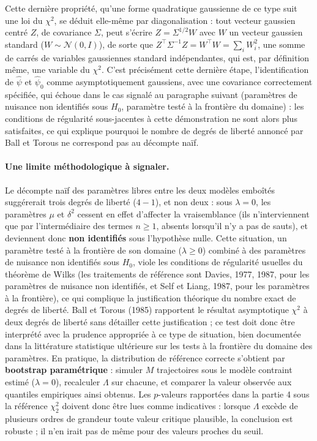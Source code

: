 \documentclass{article}
\begin{document}
Cette dernière propriété, qu'une forme quadratique gaussienne de ce type suit une loi du $\chi^2$, se déduit elle-même par diagonalisation : tout vecteur gaussien centré $Z$, de covariance $\Sigma$, peut s'écrire $Z=\Sigma^{1/2}W$ avec $W$ un vecteur gaussien standard ($W\sim\mathcal{N}(0,I)$), de sorte que $Z^\top \Sigma^{-1} Z = W^\top W = \sum_i W_i^2$, une somme de carrés de variables gaussiennes standard indépendantes, qui est, par définition même, une variable du $\chi^2$.
C'est précisément cette dernière étape, l'identification de $\hat{\psi}$ et $\hat{\psi}_0$ comme asymptotiquement gaussiens, avec une covariance correctement spécifiée, qui échoue dans le cas signalé au paragraphe suivant (paramètres de nuisance non identifiés sous $H_0$, paramètre testé à la frontière du domaine) : les conditions de régularité sous-jacentes à cette démonstration ne sont alors plus satisfaites, ce qui explique pourquoi le nombre de degrés de liberté annoncé par Ball et Torous ne correspond pas au décompte naïf.
\paragraph{Une limite méthodologique à signaler.} Le décompte naïf des paramètres libres entre les deux modèles emboîtés suggérerait trois degrés de liberté ($4-1$), et non deux : sous $\lambda=0$, les paramètres $\mu$ et $\delta^2$ cessent en effet d'affecter la vraisemblance (ils n'interviennent que par l'intermédiaire des termes $n\geq 1$, absents lorsqu'il n'y a pas de sauts), et deviennent donc \textbf{non identifiés} sous l'hypothèse nulle. Cette situation, un paramètre testé à la frontière de son domaine ($\lambda\geq 0$) combiné à des paramètres de nuisance non identifiés sous $H_0$, viole les conditions de régularité usuelles du théorème de Wilks (les traitements de référence sont Davies, 1977, 1987, pour les paramètres de nuisance non identifiés, et Self et Liang, 1987, pour les paramètres à la frontière), ce qui complique la justification théorique du nombre exact de degrés de liberté. Ball et Torous (1985) rapportent le résultat asymptotique $\chi^2$ à deux degrés de liberté sans détailler cette justification ; ce test doit donc être interprété avec la prudence appropriée à ce type de situation, bien documentée dans la littérature statistique ultérieure sur les tests à la frontière du domaine des paramètres. En pratique, la distribution de référence correcte s'obtient par \textbf{bootstrap paramétrique} : simuler $M$ trajectoires sous le modèle contraint estimé ($\lambda=0$), recalculer $\Lambda$ sur chacune, et comparer la valeur observée aux quantiles empiriques ainsi obtenus. Les $p$-valeurs rapportées dans la partie 4 sous la référence $\chi^2_2$ doivent donc être lues comme indicatives : lorsque $\Lambda$ excède de plusieurs ordres de grandeur toute valeur critique plausible, la conclusion est robuste ; il n'en irait pas de même pour des valeurs proches du seuil.
\end{document}
